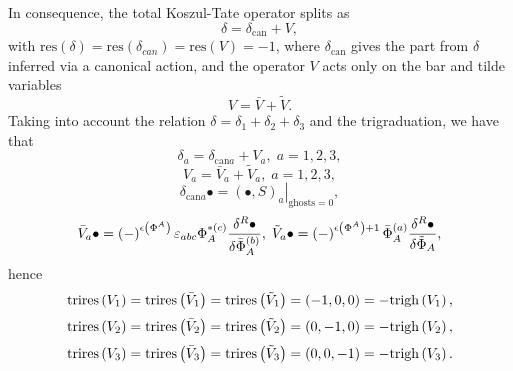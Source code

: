 \documentclass[a4paper,12pt]{article}
\begin{document}
In consequence, the total Koszul-Tate operator splits as 
\begin{equation}
\delta =\delta _{\mathrm{can}}+V,  \label{sp3.59}
\end{equation}
with $\mathrm{res}\left( \delta \right) =\mathrm{res}\left( \delta
_{can}\right) =\mathrm{res}\left( V\right) =-1$, where $\delta _{\mathrm{can}%
}$ gives the part from $\delta $ inferred via a canonical action, and the
operator $V$ acts only on the bar and tilde variables 
\begin{equation}
V=\bar{V}+\tilde{V}.  \label{sp3.60}
\end{equation}
Taking into account the relation $\delta =\delta _{1}+\delta _{2}+\delta
_{3} $ and the trigraduation, we have that 
\begin{equation}
\delta _{a}=\delta _{\mathrm{can}a}+V_{a},\;a=1,2,3,  \label{sp3.61}
\end{equation}
\begin{equation}
V_{a}=\bar{V}_{a}+\tilde{V}_{a},\;a=1,2,3,  \label{sp3.62}
\end{equation}
\begin{equation}
\delta _{\mathrm{can}a}\bullet =\left. \left( \bullet ,S\right) _{a}\right|
_{\mathrm{ghosts}=0},  \label{sp3.63}
\end{equation}
\begin{equation}
\bar{V}_{a}\bullet =\left( -\right) ^{\epsilon \left( \Phi ^{A}\right)
}\varepsilon _{abc}\Phi _{A}^{*(c)}\frac{\delta ^{R}\bullet }{\delta \bar{%
\Phi}_{A}^{(b)}},\;\tilde{V}_{a}\bullet =\left( -\right) ^{\epsilon \left(
\Phi ^{A}\right) +1}\bar{\Phi}_{A}^{(a)}\frac{\delta ^{R}\bullet }{\delta 
\tilde{\Phi}_{A}},  \label{sp3.64}
\end{equation}
hence 
\begin{equation}
\mathrm{trires}\left( V_{1}\right) =\mathrm{trires}\left( \bar{V}_{1}\right)
=\mathrm{trires}\left( \tilde{V}_{1}\right) =\left( -1,0,0\right) =-\mathrm{%
trigh}\left( V_{1}\right) ,  \label{sp3.64a}
\end{equation}
\begin{equation}
\mathrm{trires}\left( V_{2}\right) =\mathrm{trires}\left( \bar{V}_{2}\right)
=\mathrm{trires}\left( \tilde{V}_{2}\right) =\left( 0,-1,0\right) =-\mathrm{%
trigh}\left( V_{2}\right) ,  \label{sp3.64b}
\end{equation}
\begin{equation}
\mathrm{trires}\left( V_{3}\right) =\mathrm{trires}\left( \bar{V}_{3}\right)
=\mathrm{trires}\left( \tilde{V}_{3}\right) =\left( 0,0,-1\right) =-\mathrm{%
trigh}\left( V_{3}\right) .  \label{sp3.64c}
\end{equation}
\end{document}
